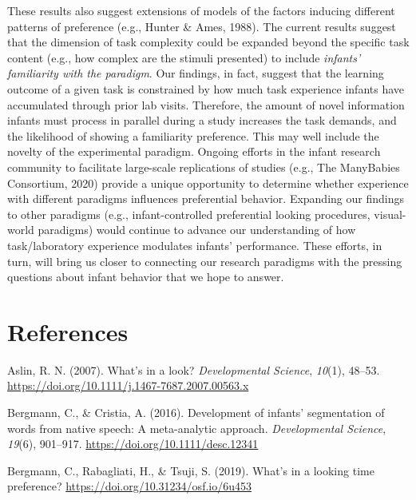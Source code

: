 \documentclass[
  english,
  man,man,floatsintext]{apa6}
\begin{document}
These results also suggest extensions of models of the factors inducing different patterns of preference (e.g., Hunter \& Ames, 1988). The current results suggest that the dimension of task complexity could be expanded beyond the specific task content (e.g., how complex are the stimuli presented) to include \emph{infants' familiarity with the paradigm}. Our findings, in fact, suggest that the learning outcome of a given task is constrained by how much task experience infants have accumulated through prior lab visits. Therefore, the amount of novel information infants must process in parallel during a study increases the task demands, and the likelihood of showing a familiarity preference. This may well include the novelty of the experimental paradigm. Ongoing efforts in the infant research community to facilitate large-scale replications of studies (e.g., The ManyBabies Consortium, 2020) provide a unique opportunity to determine whether experience with different paradigms influences preferential behavior. Expanding our findings to other paradigms (e.g., infant-controlled preferential looking procedures, visual-world paradigms) would continue to advance our understanding of how task/laboratory experience modulates infants' performance. These efforts, in turn, will bring us closer to connecting our research paradigms with the pressing questions about infant behavior that we hope to answer.

\newpage

\hypertarget{references}{%
\section*{References}\label{references}}

\begingroup
\setlength{\parindent}{-0.5in}
\setlength{\leftskip}{0.5in}

\hypertarget{refs}{}
\leavevmode\hypertarget{ref-aslin2007}{}%
Aslin, R. N. (2007). What's in a look? \emph{Developmental Science}, \emph{10}(1), 48--53. \url{https://doi.org/10.1111/j.1467-7687.2007.00563.x}

\leavevmode\hypertarget{ref-bergmann2016}{}%
Bergmann, C., \& Cristia, A. (2016). Development of infants' segmentation of words from native speech: A meta-analytic approach. \emph{Developmental Science}, \emph{19}(6), 901--917. \url{https://doi.org/10.1111/desc.12341}

\leavevmode\hypertarget{ref-bergmann2019}{}%
Bergmann, C., Rabagliati, H., \& Tsuji, S. (2019). What's in a looking time preference? \url{https://doi.org/10.31234/osf.io/6u453}
\end{document}
